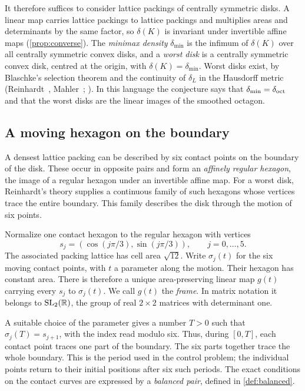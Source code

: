 It therefore suffices to consider lattice packings of centrally symmetric disks. A linear map
carries lattice packings to lattice packings and multiplies areas and determinants by the same
factor, so $\delta(K)$ is invariant under invertible affine maps (\cref{prop:converse}). The
\emph{minimax density} $\delta_{\min}$ is the infimum of $\delta(K)$ over all centrally symmetric
convex disks, and a \emph{worst disk} is a centrally symmetric convex disk, centred at the origin,
with $\delta(K)=\delta_{\min}$. Worst disks exist, by Blaschke's selection theorem and the
continuity of $\delta_L$ in the Hausdorff metric (Reinhardt~\cite{Reinhardt1934},
Mahler~\cite{Mahler1947b}; \cite[\S2.2]{HalesVajjha2024}). In this language the conjecture says
that $\delta_{\min}=\delta_{\mathrm{oct}}$ and that the worst disks are the linear images of the smoothed octagon.

\subsection{A moving hexagon on the boundary}\label{sec:setting-hexagon}

A densest lattice packing can be described by six contact points on the boundary of the disk.
These occur in opposite pairs and form an \emph{affinely regular hexagon}, the image of a regular
hexagon under an invertible affine map. For a worst disk, Reinhardt's theory supplies a continuous
family of such hexagons whose vertices trace the entire boundary. This family describes the disk
through the motion of six points.

Normalize one contact hexagon to the regular hexagon with vertices
\[
  s_j=(\cos(j\pi/3),\sin(j\pi/3)),\qquad j=0,\ldots,5.
\]
The associated packing lattice has cell area $\sqrt{12}$. Write $\sigma_j(t)$ for the six moving
contact points, with $t$ a parameter along the motion. Their hexagon has constant area. There is
therefore a unique area-preserving linear map $g(t)$ carrying every $s_j$ to $\sigma_j(t)$.
We call $g(t)$ the \emph{frame}. In matrix notation it belongs to
$\mathrm{SL}_2(\mathbb{R})$, the group of real $2\times2$ matrices with determinant one.

A suitable choice of the parameter gives a number $T>0$ such that
$\sigma_j(T)=s_{j+1}$, with the index read modulo six. Thus, during $[0,T]$, each contact point
traces one part of the boundary. The six parts together trace the whole boundary. This is the
period used in the control problem; the individual points return to their initial positions
after six such periods. The exact conditions on the contact curves are expressed by a
\emph{balanced pair}, defined in \cref{def:balanced}.

